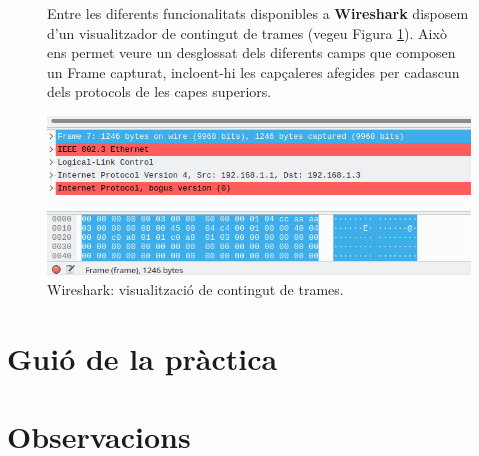 \documentclass[12pt,a4paper]{article}
\begin{document}
\newpage
\begin{figure}[!ht]
Entre les diferents funcionalitats disponibles a \textbf{Wireshark} disposem d'un visualitzador de contingut de trames (vegeu Figura \ref{wireshark-frame}). Això ens permet veure un desglossat dels diferents camps que composen un Frame capturat, incloent-hi les capçaleres afegides per cadascun dels protocols de les capes superiors.
  \begin{center}
    \includegraphics[width=1\textwidth]{wireshark-frame}
    \caption{Wireshark: visualització de contingut de trames.}
    \label{wireshark-frame}
  \end{center}
\end{figure}

\section{Guió de la pràctica}

\section*{Observacions}
\end{document}
